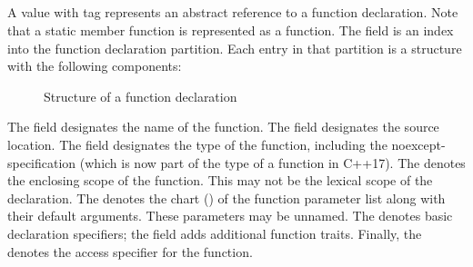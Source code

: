 

\subsection{}
\label{sec:ifc:DeclSort:Function}

A  value with tag  represents
an abstract reference to a function declaration. Note that a static member function is represented as a function.
The  field is an index into the function declaration partition.
Each entry in that partition is a structure with the following components:
%
\begin{figure}[H]
	\centering
	\caption{Structure of a function declaration}
	\label{fig:ifc-function-decl-structure}
\end{figure}
%
The  field designates the name of the function.
The  field designates the source location.
The  field designates the type of the function, including the noexcept-specification (which is now part of the type of a function in C++17).
The  denotes the enclosing scope of the function. This may not be the lexical scope of the declaration.
The  denotes the chart () of the function parameter list along with their default arguments.  These parameters may be unnamed.
The  denotes basic declaration specifiers; the  field adds additional function traits.
Finally, the  denotes the access specifier for the function.


